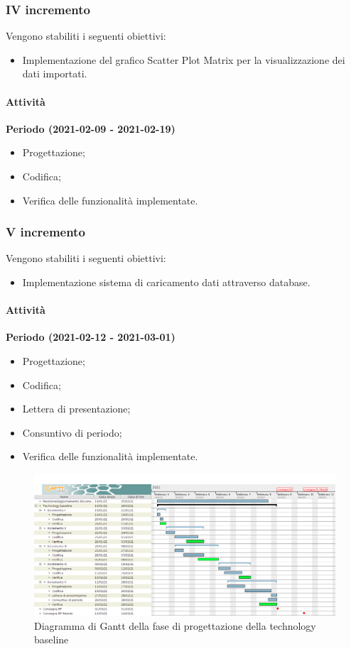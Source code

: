 \documentclass[../piano_di_progetto.tex]{subfiles}
\begin{document}
\subsubsection{IV incremento}
Vengono stabiliti i seguenti obiettivi:
\begin{itemize}
    \item Implementazione del grafico Scatter Plot Matrix per la visualizzazione dei dati importati.
\end{itemize}
\paragraph{Attività}
\noindent\textbf{Periodo (2021-02-09 - 2021-02-19)}
\begin{itemize}
    \item Progettazione;
    \item Codifica;
    \item Verifica delle funzionalità implementate.
\end{itemize}

\subsubsection{V incremento}
Vengono stabiliti i seguenti obiettivi:
\begin{itemize}
    \item Implementazione sistema di caricamento dati attraverso database.
\end{itemize}
\paragraph{Attività}
\noindent\textbf{Periodo (2021-02-12 - 2021-03-01)}
\begin{itemize}
    \item Progettazione;
    \item Codifica;
    \item Lettera di presentazione;
    \item Consuntivo di periodo;
    \item Verifica delle funzionalità implementate.
\end{itemize}


\begin{figure}[H]
    \centering
    \includegraphics[width=18cm]{src/img/gantt/4_3_tech_baseline.png}
    \caption{Diagramma di Gantt della fase di progettazione della technology baseline}
\end{figure}
\end{document}
